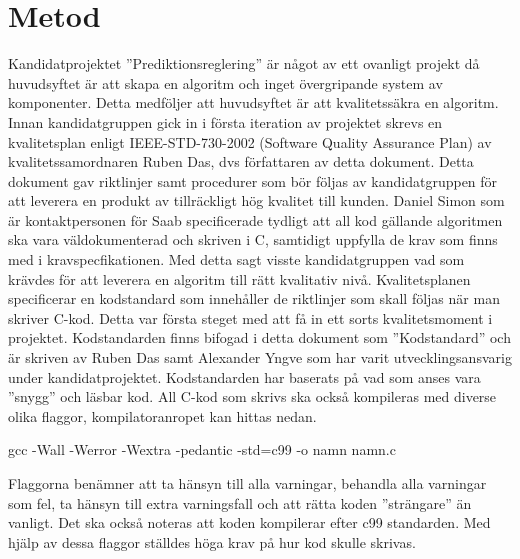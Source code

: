 \section{Metod}
Kandidatprojektet ''Prediktionsreglering'' är något av ett ovanligt projekt då huvudsyftet är att skapa en algoritm och inget övergripande system av komponenter. Detta medföljer att huvudsyftet är att kvalitetssäkra en algoritm.
\newline
\newline
Innan kandidatgruppen gick in i första iteration av projektet skrevs en kvalitetsplan enligt IEEE-STD-730-2002 (Software Quality Assurance Plan) av kvalitetssamordnaren Ruben Das, dvs författaren av detta dokument. Detta dokument gav riktlinjer samt procedurer som bör följas av kandidatgruppen för att leverera en produkt av tillräckligt hög kvalitet till kunden. Daniel Simon som är kontaktpersonen för Saab specificerade tydligt att all kod gällande algoritmen ska vara väldokumenterad och skriven i C, samtidigt uppfylla de krav som finns med i kravspecfikationen. Med detta sagt visste kandidatgruppen vad som krävdes för att leverera en algoritm till rätt kvalitativ nivå. Kvalitetsplanen specificerar en kodstandard som innehåller de riktlinjer som skall följas när man skriver C-kod. Detta var första steget med att få in ett sorts kvalitetsmoment i projektet. Kodstandarden finns bifogad i detta dokument som ''Kodstandard'' och är skriven av Ruben Das samt Alexander Yngve som har varit utvecklingsansvarig under kandidatprojektet. Kodstandarden har baserats på vad som anses vara ''snygg'' och läsbar kod. All C-kod som skrivs ska också kompileras med diverse olika flaggor, kompilatoranropet kan hittas nedan.
\begin{tcolorbox}[boxrule=1pt,leftrule=5pt,arc=0pt,auto outer arc]
gcc -Wall -Werror -Wextra -pedantic -std=c99 -o namn namn.c
\end{tcolorbox}
\noindent Flaggorna benämner att ta hänsyn till alla varningar, behandla alla varningar som fel, ta hänsyn till extra varningsfall och att rätta koden ''strängare'' än vanligt. Det ska också noteras att koden kompilerar efter c99 standarden. Med hjälp av dessa flaggor ställdes höga krav på hur kod skulle skrivas.
\newline
\newline
